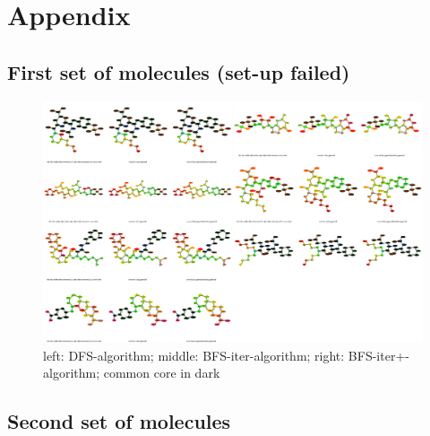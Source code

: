 \chapter{Appendix}

\section{First set of molecules (set-up failed)}

\begin{figure}[h!]
	
	\includegraphics[scale=0.50]{routes_first_set_failed}\caption{left: DFS-algorithm; middle: BFS-iter-algorithm; right: BFS-iter+-algorithm; common core in dark}
	
\end{figure}

\section{Second set of molecules}

